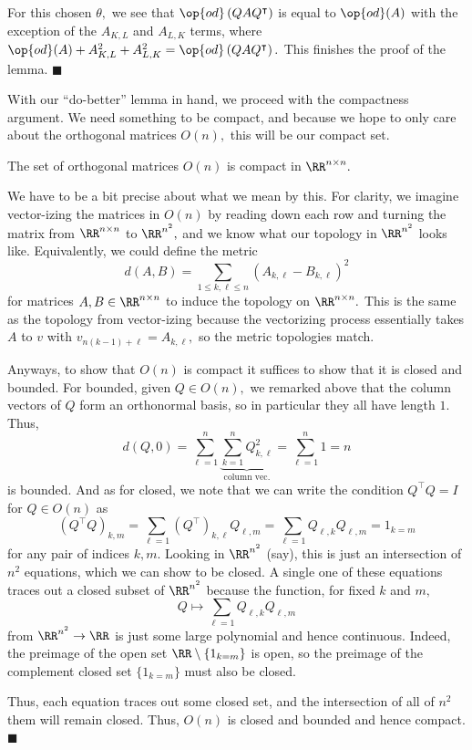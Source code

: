 For this chosen $\theta,$ we see that $\op{od}\left(QAQ^\intercal\right)$ is equal to $\op{od}(A)$ with the exception of the $A_{K,L}$ and $A_{L,K}$ terms, where $\op{od}(A)+A_{K,L}^2+A_{L,K}^2=\op{od}\left(QAQ^\intercal\right).$ This finishes the proof of the lemma. $\blacksquare$

With our ``do-better'' lemma in hand, we proceed with the compactness argument. We need something to be compact, and because we hope to only care about the orthogonal matrices $O(n),$ this will be our compact set.
\begin{lemma}
    The set of orthogonal matrices $O(n)$ is compact in $\RR^{n\times n}.$
\end{lemma}
We have to be a bit precise about what we mean by this. For clarity, we imagine vector-izing the matrices in $O(n)$ by reading down each row and turning the matrix from $\RR^{n\times n}$ to $\RR^{n^2},$ and we know what our topology in $\RR^{n^2}$ looks like. Equivalently, we could define the metric
\[d(A,B)=\sum_{1\le k,\ell\le n}(A_{k,\ell}-B_{k,\ell})^2\]
for matrices $A,B\in\RR^{n\times n}$ to induce the topology on $\RR^{n\times n}.$ This is the same as the topology from vector-izing because the vectorizing process essentially takes $A$ to $v$ with $v_{n(k-1)+\ell}=A_{k,\ell},$ so the metric topologies match.

Anyways, to show that $O(n)$ is compact it suffices to show that it is closed and bounded. For bounded, given $Q\in O(n),$ we remarked above that the column vectors of $Q$ form an orthonormal basis, so in particular they all have length $1.$ Thus,
\[d(Q,0)=\sum_{\ell=1}^n\underbrace{\sum_{k=1}^nQ_{k,\ell}^2}_{\text{column vec.}}=\sum_{\ell=1}^n1=n\]
is bounded. And as for closed, we note that we can write the condition $Q^\intercal Q=I$ for $Q\in O(n)$ as
\[\left(Q^\intercal Q\right)_{k,m}=\sum_{\ell=1}\left(Q^\intercal\right)_{k,\ell}Q_{\ell,m}=\sum_{\ell=1}Q_{\ell,k}Q_{\ell,m}=1_{k=m}\]
for any pair of indices $k,m.$ Looking in $\RR^{n^2}$ (say), this is just an intersection of $n^2$ equations, which we can show to be closed. A single one of these equations traces out a closed subset of $\RR^{n^2}$ because the function, for fixed $k$ and $m,$
\[Q\mapsto\sum_{\ell=1}Q_{\ell,k}Q_{\ell,m}\]
from $\RR^{n^2}\to\RR$ is just some large polynomial and hence continuous. Indeed, the preimage of the open set $\RR\setminus\{1_{k=m}\}$ is open, so the preimage of the complement closed set $\{1_{k=m}\}$ must also be closed.

Thus, each equation traces out some closed set, and the intersection of all of $n^2$ them will remain closed. Thus, $O(n)$ is closed and bounded and hence compact. $\blacksquare$

